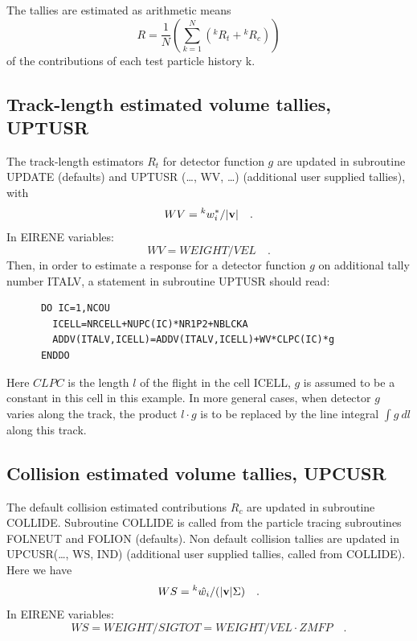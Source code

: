 The tallies are estimated as arithmetic means
\begin{equation}
  R = \frac{1}{N}
  \left ( \sum_{k=1}^{N} (^k{R_t}  +	{^k{R_c}} ) \right )
\end{equation}
of
the contributions of each test particle history k.

\subsection{Track-length estimated volume tallies, UPTUSR}\label{sec3.2.1}

The track-length estimators $R_t$ for detector function $g$ are updated in
subroutine UPDATE (defaults) and UPTUSR (\dots, WV, \dots) (additional user
supplied tallies), with
\begin{displaymath}
  WV = {^k{w_{i}^{*}}} /   | \mathbf{v} |
  \quad .
\end{displaymath}
In EIRENE variables:
\begin{displaymath}
  WV = WEIGHT/VEL  \quad .
\end{displaymath}
Then, in order to estimate a response for a detector function $g$ on additional
tally number ITALV, a statement in subroutine UPTUSR should read:

\begin{lstlisting}
      DO IC=1,NCOU
        ICELL=NRCELL+NUPC(IC)*NR1P2+NBLCKA
        ADDV(ITALV,ICELL)=ADDV(ITALV,ICELL)+WV*CLPC(IC)*g
      ENDDO
\end{lstlisting}

Here $CLPC$ is the length $l$ of the flight in the cell ICELL, $g$ is assumed
to be a constant in this cell in this example.
In more general cases, when detector $g$ varies along the track, the product $l
  \cdot g$ is to be replaced by the line integral $\int g~ dl$ along this track.

\subsection{Collision estimated volume tallies, UPCUSR}\label{sec3.2.2}

The default collision estimated contributions $R_c$ are updated in subroutine
COLLIDE.
Subroutine COLLIDE is called from the particle tracing subroutines FOLNEUT and
FOLION (defaults).
Non default collision tallies are updated in UPCUSR(\dots, WS, IND) (additional
user supplied tallies, called from COLLIDE).
Here we have
\begin{displaymath}
  WS = {^k{\hat{w_i}}} /   ( | \mathbf{v} |  \Sigma )
  \quad .
\end{displaymath}
In EIRENE variables:
\begin{displaymath}
  WS = WEIGHT/SIGTOT = WEIGHT/VEL \cdot ZMFP \quad .
\end{displaymath}

